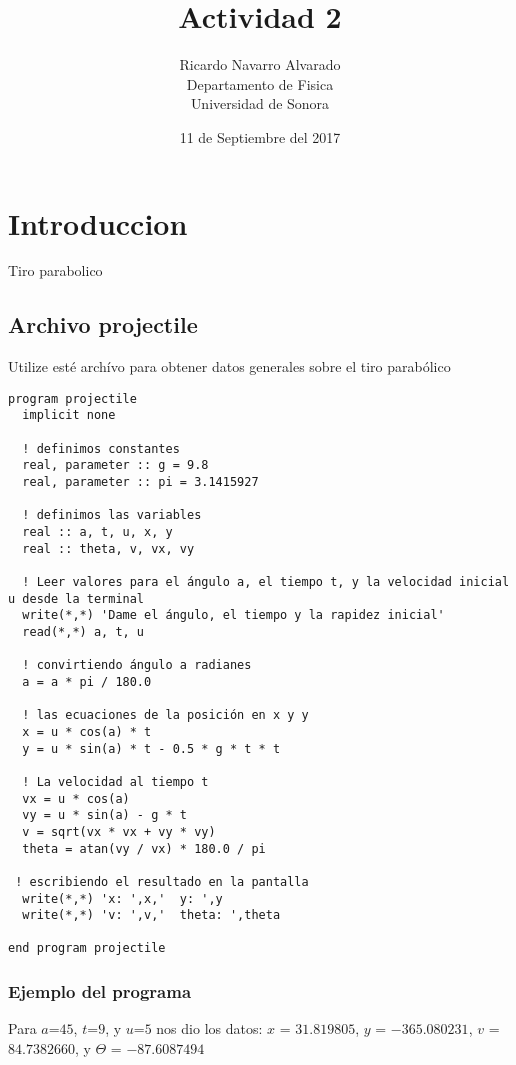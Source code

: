 \documentclass{article}
\title{Actividad 2}
\author{Ricardo Navarro Alvarado \\
 Departamento de Fisica \\
 Universidad de Sonora}
\date{11 de Septiembre del 2017}
\begin{document}
\maketitle

\section{Introduccion}
Tiro parabolico
\subsection{Archivo projectile}
Utilize esté archívo para obtener datos generales sobre el tiro parabólico
\begin{verbatim}
program projectile
  implicit none

  ! definimos constantes
  real, parameter :: g = 9.8
  real, parameter :: pi = 3.1415927

  ! definimos las variables
  real :: a, t, u, x, y
  real :: theta, v, vx, vy

  ! Leer valores para el ángulo a, el tiempo t, y la velocidad inicial u desde la terminal
  write(*,*) 'Dame el ángulo, el tiempo y la rapidez inicial'
  read(*,*) a, t, u

  ! convirtiendo ángulo a radianes
  a = a * pi / 180.0
  
  ! las ecuaciones de la posición en x y y
  x = u * cos(a) * t
  y = u * sin(a) * t - 0.5 * g * t * t

  ! La velocidad al tiempo t
  vx = u * cos(a)
  vy = u * sin(a) - g * t
  v = sqrt(vx * vx + vy * vy)
  theta = atan(vy / vx) * 180.0 / pi
 
 ! escribiendo el resultado en la pantalla
  write(*,*) 'x: ',x,'  y: ',y
  write(*,*) 'v: ',v,'  theta: ',theta

end program projectile
\end{verbatim}
\subsubsection{Ejemplo del programa}
Para $a$=$45$, $t$=$9$, y $u$=$5$ nos dio los datos:
$x$ = $31.819805$, $y$ = $-365.080231$, $v$ = $84.7382660$, y $\Theta$ = $-87.6087494$
\end{document}
